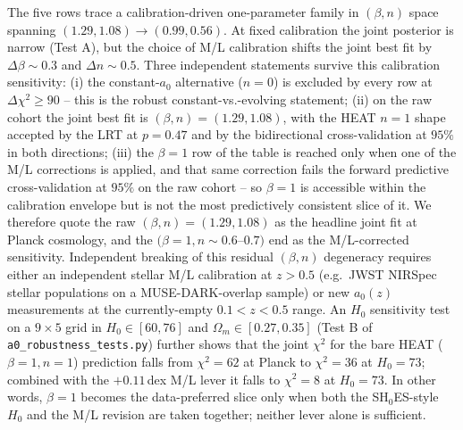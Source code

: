\documentclass[twocolumn,letterpaper]{aastex631}
\newcommand{\azero}{a_0}
\begin{document}
\noindent The five rows trace a calibration-driven
one-parameter family in $(\beta,n)$ space spanning
$(1.29,1.08)\!\to\!(0.99,0.56)$.  At fixed calibration the
joint posterior is narrow (Test A), but
the choice of M/L calibration shifts the joint best fit by
$\Delta\beta\!\sim\!0.3$ and $\Delta n\!\sim\!0.5$.  Three
independent statements survive this calibration sensitivity:
(i) the constant-$\azero$ alternative ($n\!=\!0$) is excluded
by every row at $\Delta\chi^{2}\!\geq\!90$ -- this is the
robust constant-vs.-evolving statement;
(ii) on the raw cohort the joint best fit is
$(\beta, n)\!=\!(1.29, 1.08)$, with the HEAT $n\!=\!1$ shape
accepted by the LRT at $p\!=\!0.47$ and by the bidirectional
cross-validation at $95\%$ in both directions;
(iii) the $\beta\!=\!1$ row of the table is reached only when
one of the M/L corrections is applied, and that same correction
fails the forward predictive cross-validation at $95\%$ on the
raw cohort -- so $\beta\!=\!1$ is accessible within the
calibration envelope but is not the most predictively
consistent slice of it.  We therefore quote the raw
$(\beta, n)\!=\!(1.29, 1.08)$ as the headline joint fit at
Planck cosmology, and the $(\beta\!=\!1, n\!\sim\!0.6$--$0.7)$
end as the M/L-corrected sensitivity.  Independent breaking of
this residual $(\beta,n)$ degeneracy requires either an
independent stellar M/L calibration at $z\!>\!0.5$
(e.g.\ JWST NIRSpec stellar populations on a
MUSE-DARK-overlap sample) or new $\azero(z)$ measurements at
the currently-empty $0.1\!<\!z\!<\!0.5$ range.  An $H_{0}$
sensitivity test on a $9{\times}5$ grid in
$H_{0}\!\in\![60,76]$ and $\Omega_{m}\!\in\![0.27,0.35]$
(Test B of \texttt{a0\_robustness\_tests.py}) further shows
that the joint $\chi^{2}$ for the bare HEAT
($\beta\!=\!1, n\!=\!1$) prediction falls from $\chi^{2}\!=\!62$
at Planck to $\chi^{2}\!=\!36$ at $H_{0}\!=\!73$; combined with
the $+0.11$\,dex M/L lever it falls to $\chi^{2}\!=\!8$ at
$H_{0}\!=\!73$.  In other words, $\beta\!=\!1$ becomes the
data-preferred slice only when both the SH$_{0}$ES-style $H_{0}$
and the M/L revision are taken together; neither lever alone is
sufficient.
\end{document}
